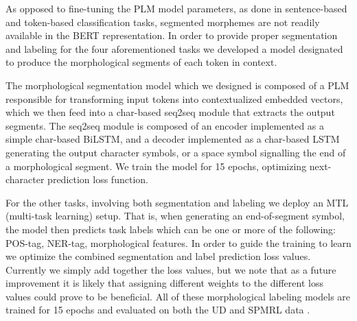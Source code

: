 \documentclass[11pt,a4paper]{article}
\begin{document}
\begin{table*}[t]
\caption{\label{tab:tasks} 
Illustration of Evaluated Token and Morpheme-Based Downstream Tasks. The input is the two-word input phrase ``'' ({\em to the White House}). Sequence and Hebrew text goes from right to left.
  }
\end{table*}

As opposed to fine-tuning the PLM model parameters, as done in sentence-based and token-based classification tasks, segmented morphemes are not readily available in the BERT representation. 
In order to provide proper segmentation and labeling for the four aforementioned tasks we developed a model designated to produce the morphological segments of  each token in context.

The morphological segmentation model which we designed is composed of a PLM responsible for transforming input tokens into contextualized embedded vectors, which we then feed into a char-based seq2seq module that extracts the output segments.
The seq2seq module is composed of an encoder implemented as a simple char-based BiLSTM, and a decoder implemented as a char-based LSTM generating the output character symbols, or a space symbol signalling the end of a morphological segment. We train the model for 15 epochs, optimizing next-character prediction loss function.

For the other tasks, involving both segmentation and labeling we deploy an MTL (multi-task learning) setup. That is, when generating an end-of-segment symbol, the model then predicts task labels which can be one or more of the following: POS-tag, NER-tag, morphological features. In order to guide the training to learn we optimize the combined segmentation and label prediction loss values. Currently we simply add together the loss values, but we note that as a future improvement it is likely that assigning different weights to the different loss values could prove to be beneficial.
All of these morphological labeling models are trained for 15 epochs and evaluated on both the UD \cite{hebUD} and SPMRL data \cite{spmrl}.
\end{document}
